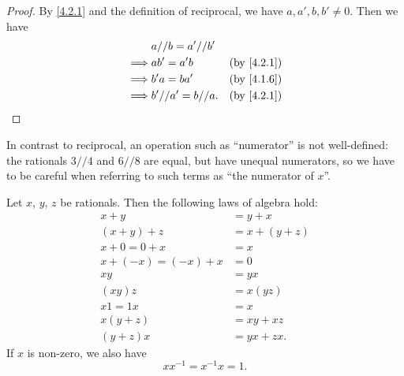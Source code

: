 \begin{proof}
  By \cref{4.2.1} and the definition of reciprocal, we have \(a, a', b, b' \neq 0\).
  Then we have
  \begin{align*}
             & a // b = a' // b'                             \\
    \implies & ab' = a'b          & \text{(by \cref{4.2.1})} \\
    \implies & b'a = ba'          & \text{(by \cref{4.1.6})} \\
    \implies & b' // a' = b // a. & \text{(by \cref{4.2.1})}
  \end{align*}
\end{proof}

\begin{note}
  In contrast to reciprocal, an operation such as ``numerator'' is not well-defined:
  the rationals \(3 // 4\) and \(6 // 8\) are equal, but have unequal numerators, so we have to be careful when referring to such terms as ``the numerator of \(x\)''.
\end{note}

\begin{prop}\label{4.2.4}
  Let \(x\), \(y\), \(z\) be rationals.
  Then the following laws of algebra hold:
  \begin{align*}
    x + y               & = y + x       \\
    (x + y) + z         & = x + (y + z) \\
    x + 0 = 0 + x       & = x           \\
    x + (-x) = (-x) + x & = 0           \\
    xy                  & = yx          \\
    (xy)z               & = x(yz)       \\
    x1 = 1x             & = x           \\
    x(y + z)            & = xy + xz     \\
    (y + z)x            & = yx + zx.
  \end{align*}
  If \(x\) is non-zero, we also have
  \[
    xx^{-1} = x^{-1}x = 1.
  \]
\end{prop}

